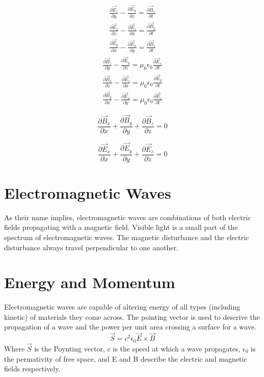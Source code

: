 \documentclass[12pt]{report}
\begin{document}
\begin{equation}
\begin{array}{c}
\displaystyle \frac{\partial\vec{E}_z}{\partial y} - \frac{\partial\vec{E}_y}{\partial z} = \frac{\partial\vec{B}_x}{\partial t} \\
\displaystyle\frac{\partial\vec{E}_x}{\partial z} - \frac{\partial\vec{E}_z}{\partial x} = \frac{\partial\vec{B}_y}{\partial t} \\
\displaystyle\frac{\partial\vec{E}_y}{\partial x} - \frac{\partial\vec{E}_x}{\partial y} = \frac{\partial\vec{B}_z}{\partial t}
\end{array}
\end{equation}
\begin{equation}
\begin{array}{c}
\displaystyle\frac{\partial\vec{B}_z}{\partial y} - \frac{\partial\vec{E}_y}{\partial z} = \mu_0\epsilon_0 \frac{\partial\vec{E}_x}{\partial t} \\
\displaystyle\frac{\partial\vec{B}_x}{\partial z} - \frac{\partial\vec{E}_z}{\partial x} = \mu_0\epsilon_0 \frac{\partial\vec{E}_y}{\partial t} \\
\displaystyle\frac{\partial\vec{B}_y}{\partial x} - \frac{\partial\vec{E}_x}{\partial y} = \mu_0\epsilon_0 \frac{\partial\vec{E}_z}{\partial t}
\end{array}
\end{equation}

\begin{equation}
\frac{\partial\vec{B}_x}{\partial x}+\frac{\partial\vec{B}_y}{\partial y}+\frac{\partial\vec{B}_z}{\partial z} = 0
\end{equation}

\begin{equation}
\frac{\partial\vec{E}_x}{\partial x}+\frac{\partial\vec{E}_y}{\partial y}+\frac{\partial\vec{E}_z}{\partial z} = 0
\end{equation}

\section{Electromagnetic Waves}
As their name implies, electromagnetic waves are combinations of both electric fields propagating with a magnetic field. Visible light is a small part of the spectrum of electromagnetic waves. The magnetic disturbance and the electric disturbance always travel perpendicular to one another.  

\section{Energy and Momentum}
Electromagnetic waves are capable of altering energy of all types (including kinetic) of materials they come across. The pointing vector is used to descrive the propagation of a wave and the power per unit area crossing a surface for a wave. 
\begin{equation}
\vec{S} = c^2\epsilon_0 \vec{E}\times\vec{B}
\end{equation}
Where $\vec{S}$ is the Poynting vector, c is the speed at which a wave propagates, $\epsilon_0$ is the permativity of free space, and E and B describe the electric and magnetic fields respectively. 
\end{document}
